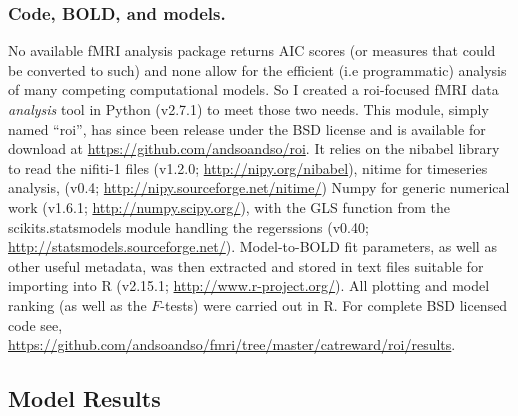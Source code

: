 \documentclass[doc,12pt]{apa}        %
\begin{document}
\subsubsection{Code, BOLD, and models.}
\label{subsub:aggregating}
No available fMRI analysis package returns AIC scores (or measures that could be converted to such) and none allow for the efficient (i.e programmatic) analysis of many competing computational models. So I created a roi-focused fMRI data \emph{analysis} tool in Python (v2.7.1) to meet those two needs.  This module, simply named ``roi'', has since been release under the BSD license and is available for download at \url{https://github.com/andsoandso/roi}. It relies on the nibabel library to read the nifiti-1 files  (v1.2.0; \url{http://nipy.org/nibabel}), nitime for timeseries analysis, (v0.4; \url{http://nipy.sourceforge.net/nitime/}) Numpy for generic numerical work (v1.6.1; \url{http://numpy.scipy.org/}), with the GLS function from the scikits.statsmodels module handling the regerssions (v0.40; \url{http://statsmodels.sourceforge.net/}).  Model-to-BOLD fit parameters, as well as other useful metadata, was then extracted and stored in text files suitable for importing into R (v2.15.1; \url{http://www.r-project.org/}).  All plotting and model ranking (as well as the $F$-tests) were carried out in R.  For complete BSD licensed code see, \url{https://github.com/andsoandso/fmri/tree/master/catreward/roi/results}.

\subsection{Model Results}
\label{sub:modelresults}


\newpage

\end{document}
